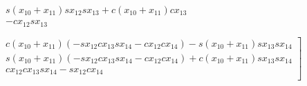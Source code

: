 \begin{multline}
\begin{matrix}
s\left(x_{10}+x_{11}\right) sx_{12} sx_{13} +c\left(x_{10}+x_{11}\right) cx_{13} \\
-cx_{12} sx_{13} \\
\end{matrix}
\\
\left.
\begin{matrix}
c\left(x_{10}+x_{11}\right)\left(-sx_{12} cx_{13} sx_{14} -cx_{12} cx_{14} \right)-s\left(x_{10}+x_{11}\right) sx_{13} sx_{14} \\
s\left(x_{10}+x_{11}\right)\left(-sx_{12} cx_{13} sx_{14} -cx_{12} cx_{14} \right)+c\left(x_{10}+x_{11}\right) sx_{13} sx_{14} \\
 cx_{12} cx_{13} sx_{14} -sx_{12} cx_{14} \\
\end{matrix}
\right]\\
\end{multline}

